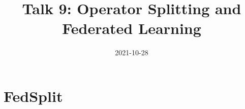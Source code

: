 


\title[]{Talk 9: Operator Splitting and Federated Learning}
\date{2021-10-28}




\setlength{\belowdisplayskip}{5pt} \setlength{\belowdisplayshortskip}{5pt}
\setlength{\abovedisplayskip}{5pt} \setlength{\abovedisplayshortskip}{5pt}


\begin{frame}
\titlepage %
\end{frame}


\section{FedSplit}


